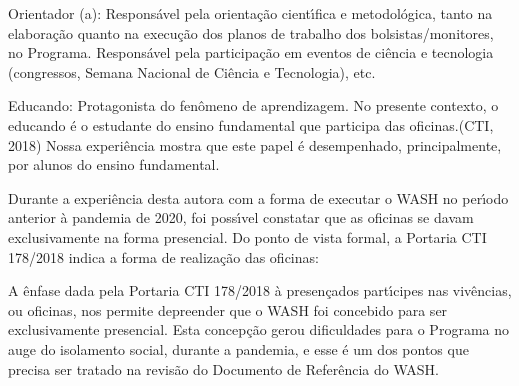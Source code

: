 \documentclass[
12pt,		%
openright,	%
twoside,  %
a4paper,			%
chapter=TITLE,		%
english,			%
french,				%
spanish,			%
brazil				%
]{USPSC-classe/USPSC}
\begin{document}
\begin{alineas}
\item Orientador (a): \textquotedbl Respons\'avel pela orienta\c{c}\~ao cient\'{\i}fica e metodol\'ogica, tanto na elabora\c{c}\~ao quanto na execu\c{c}\~ao dos planos de trabalho dos bolsistas/monitores, no Programa. Respons\'avel pela participa\c{c}\~ao em eventos de ci\^encia e tecnologia (congressos, Semana Nacional de Ci\^encia e Tecnologia), etc.\textquotedbl 
\item Educando: \textquotedbl Protagonista do fen\^omeno de aprendizagem. No presente contexto, o educando \'e o estudante do ensino fundamental que participa das oficinas.\textquotedbl  (CTI, 2018) Nossa experi\^encia mostra que este papel \'e desempenhado, principalmente, por alunos do ensino fundamental.
\end{alineas}

Durante a experi\^encia desta autora com a forma de executar o WASH no per\'{\i}odo anterior \`a pandemia de 2020, foi poss\'{\i}vel constatar que as oficinas se davam exclusivamente na forma presencial. Do ponto de vista formal, a Portaria CTI 178/2018 indica  a forma de realiza\c{c}\~ao das oficinas:










\noindent\begin{center}\mbox{\centering{}}\end{center}


A \^enfase dada pela Portaria CTI 178/2018 \`a \textquotedbl presen\c{c}a\textquotedbl  dos part\'{\i}cipes nas \textquotedbl viv\^encias\textquotedbl , ou oficinas, nos permite depreender que o WASH foi concebido para ser exclusivamente presencial. Esta concep\c{c}\~ao gerou dificuldades para o Programa no auge do isolamento social, durante a pandemia, e esse \'e um dos pontos que precisa ser tratado na revis\~ao do Documento de Refer\^encia do WASH.
\end{document}
